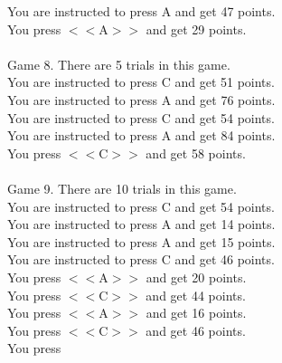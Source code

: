 \documentclass[pdflatex,sn-nature]{sn-jnl}%
\theoremstyle{thmstyleone}%
\theoremstyle{thmstyletwo}%
\theoremstyle{thmstylethree}%
\begin{document}
You are instructed to press A and get 47 points. $~$\\ 
You press $<<$A$>>$ and get 29 points. $~$\\ 
 $~$\\ 
Game 8. There are 5 trials in this game. $~$\\ 
You are instructed to press C and get 51 points. $~$\\ 
You are instructed to press A and get 76 points. $~$\\ 
You are instructed to press C and get 54 points. $~$\\ 
You are instructed to press A and get 84 points. $~$\\ 
You press $<<$C$>>$ and get 58 points. $~$\\ 
 $~$\\ 
Game 9. There are 10 trials in this game. $~$\\ 
You are instructed to press C and get 54 points. $~$\\ 
You are instructed to press A and get 14 points. $~$\\ 
You are instructed to press A and get 15 points. $~$\\ 
You are instructed to press C and get 46 points. $~$\\ 
You press $<<$A$>>$ and get 20 points. $~$\\ 
You press $<<$C$>>$ and get 44 points. $~$\\ 
You press $<<$A$>>$ and get 16 points. $~$\\ 
You press $<<$C$>>$ and get 46 points. $~$\\ 
You press  
\end{document}
